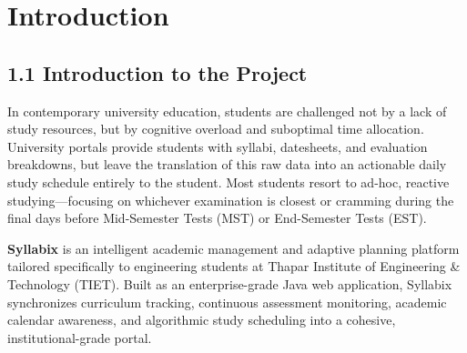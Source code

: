 \documentclass[12pt,a4paper]{report}
\begin{document}
\newpage
\tableofcontents

\newpage
\chapter{\color{ThaparCrimson} Introduction}

\section{1.1 Introduction to the Project}
In contemporary university education, students are challenged not by a lack of study resources, but by cognitive overload and suboptimal time allocation. University portals provide students with syllabi, datesheets, and evaluation breakdowns, but leave the translation of this raw data into an actionable daily study schedule entirely to the student. Most students resort to ad-hoc, reactive studying—focusing on whichever examination is closest or cramming during the final days before Mid-Semester Tests (MST) or End-Semester Tests (EST).

\textbf{Syllabix} is an intelligent academic management and adaptive planning platform tailored specifically to engineering students at Thapar Institute of Engineering \& Technology (TIET). Built as an enterprise-grade Java web application, Syllabix synchronizes curriculum tracking, continuous assessment monitoring, academic calendar awareness, and algorithmic study scheduling into a cohesive, institutional-grade portal.
\end{document}

